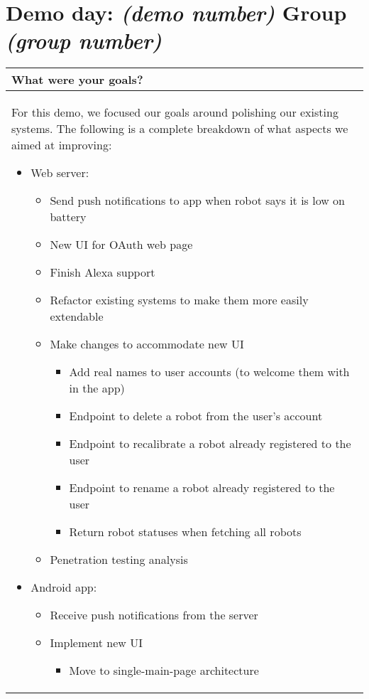 \documentclass[a4paper]{article}
\newcommand{\colWidth}{141mm}
\begin{document}
 
\section*{Demo day: \textit{(demo number)} Group \textit{(group number)}}


\begin{center}
\begin{tabular}{|p{\colWidth}|}
	\hline
	\cellcolor{blue!25}\large
	\textbf{What were your goals?}
	\\ \hline
	
		For this demo, we focused our goals around polishing our existing systems.
		The following is a complete breakdown of what aspects we aimed at improving:
		\begin{itemize}
			\item Web server:
			\begin{itemize}
				\item Send push notifications to app when robot says it is low on battery
				\item New UI for OAuth web page
				\item Finish Alexa support
				\item Refactor existing systems to make them more easily extendable
				\item Make changes to accommodate new UI
				\begin{itemize}
					\item Add real names to user accounts (to welcome them with in the app)
					\item Endpoint to delete a robot from the user's account
					\item Endpoint to recalibrate a robot already registered to the user
					\item Endpoint to rename a robot already registered to the user
					\item Return robot statuses when fetching all robots
				\end{itemize}
				\item Penetration testing analysis
			\end{itemize}
			\item Android app:
			\begin{itemize}
				\item Receive push notifications from the server
				\item Implement new UI
				\begin{itemize}
					\item Move to single-main-page architecture

\end{itemize}
\end{itemize}
\end{itemize}
\end{tabular}
\end{center}
\end{document}
